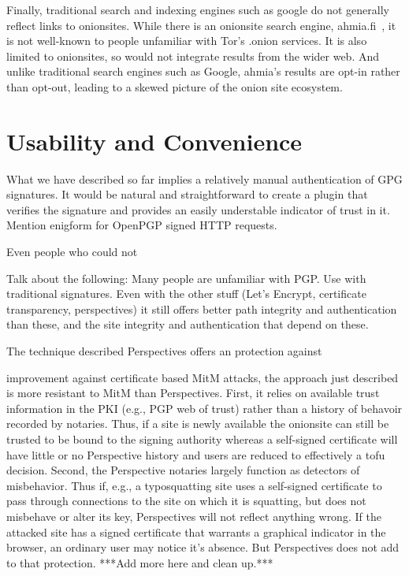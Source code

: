 \documentclass[10pt, conference, compsocconf]{styles/IEEEtran}
\begin{document}
Finally, traditional search and indexing engines such as google do
not generally reflect links to onionsites. While there is an onionsite
search engine, ahmia.fi~\cite{ahmia}, it is not well-known to
people unfamiliar with Tor's .onion services. It is also limited to
onionsites, so would not integrate results from the wider web.  And 
unlike traditional search engines such as Google, ahmia's results are 
opt-in rather than opt-out, leading to a skewed picture of the onion 
site ecosystem.

\section{Usability and Convenience}

What we have described so far implies a relatively manual
authentication of GPG signatures. It would be natural and
straightforward to create a plugin that verifies the signature
and provides an easily understable indicator of trust in it.
Mention enigform for OpenPGP signed HTTP requests.

Even people who could not 

Talk about the following: Many people are unfamiliar with PGP. Use
with traditional signatures.  Even with the other stuff (Let's
Encrypt, certificate transparency, perspectives) it still offers
better path integrity and authentication than these, and the site
integrity and authentication that depend on these.

The technique described 
Perspectives offers an protection against

improvement against certificate
based MitM attacks, the approach just described is more resistant to
MitM than Perspectives. First, it relies on available trust
information in the PKI (e.g., PGP web of trust) rather than a history
of behavoir recorded by notaries.  Thus, if a site is newly available
the onionsite can still be trusted to be bound to the signing
authority whereas a self-signed certificate will have little or no
Perspective history and users are reduced to effectively a tofu
decision. Second, the Perspective notaries largely function as
detectors of misbehavior. Thus if, e.g., a typosquatting site uses a
self-signed certificate to pass through connections to the site on
which it is squatting, but does not misbehave or alter its key,
Perspectives will not reflect anything wrong. If the attacked site
has a signed certificate that warrants a graphical indicator in
the browser, an ordinary user may notice it's absence. But Perspectives
does not add to that protection.
***Add more here and clean up.***
\end{document}
